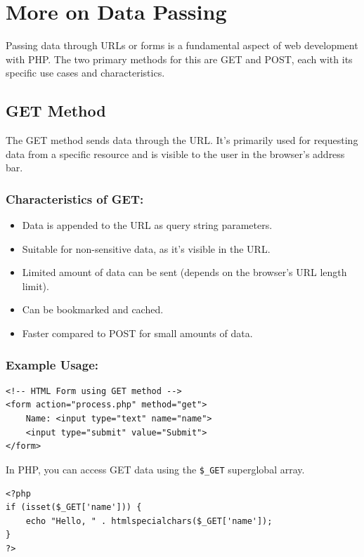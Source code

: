 \documentclass[11pt]{article}
\date{}
\title{}
\begin{document}
\setcounter{tocdepth}{3}
\tableofcontents

\setlength\parindent{10pt}

\section{More on Data Passing}
\label{sec:org6c62f7f}
Passing data through URLs or forms is a fundamental aspect of web
development with PHP. The two primary methods for this are GET and POST,
each with its specific use cases and characteristics.

\subsection{GET Method}
\label{sec:org3e8e0e4}
The GET method sends data through the URL. It's primarily used for
requesting data from a specific resource and is visible to the user in
the browser's address bar.

\subsubsection{Characteristics of GET:}
\label{sec:org8ee353a}
\begin{itemize}
\item Data is appended to the URL as query string parameters.
\item Suitable for non-sensitive data, as it's visible in the URL.
\item Limited amount of data can be sent (depends on the browser's URL
length limit).
\item Can be bookmarked and cached.
\item Faster compared to POST for small amounts of data.
\end{itemize}

\subsubsection{Example Usage:}
\label{sec:org3a79999}
\begin{verbatim}
<!-- HTML Form using GET method -->
<form action="process.php" method="get">
    Name: <input type="text" name="name">
    <input type="submit" value="Submit">
</form>
\end{verbatim}

In PHP, you can access GET data using the \texttt{\$\_GET} superglobal array.

\begin{verbatim}
<?php
if (isset($_GET['name'])) {
    echo "Hello, " . htmlspecialchars($_GET['name']);
}
?>
\end{verbatim}
\end{document}
